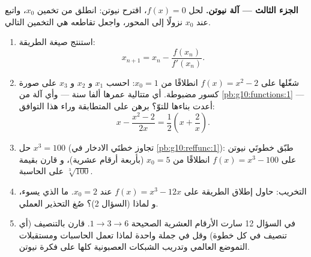\begin{problem}
\medskip
\noindent\textbf{الجزء الثالث --- آلة نيوتن.}
لحل $f(x) = 0$، اقترح نيوتن: انطلق من تخمين
$x_0$، واتبع  عند $x_0$ نزولًا إلى المحور، واجعل
 تقاطعه هي التخمين التالي.
\begin{enumerate}[resume]
  \item استنتج صيغة الطريقة:
        \[
        x_{n + 1} = x_n - \frac{f(x_n)}{f'(x_n)} .
        \]
  \item شغّلها على $f(x) = x^2 - 2$ انطلاقًا من $x_0 = 1$: احسب
        $x_1$ و $x_2$ و $x_3$ على صورة كسور مضبوطة. أي
        متتالية عمرها ألفا سنة --- وأي آلة
        من \cref{pb:g10:functions:1} --- أعدت بناءها للتوّ؟
        برهن على المتطابقة وراء هذا التوافق:
        \[
        x - \frac{x^2 - 2}{2x} = \frac12\left(x +
        \frac2x\right).
        \]
  \item حل $x^3 = 100$ (تجاوز خطتَي الادخار في
        \cref{pb:g10:reffunc:1}): طبّق خطوتَي نيوتن على
        $f(x) = x^3 - 100$ انطلاقًا من $x_0 = 5$ (بأربعة أرقام عشرية)، و
        قارن بقيمة $\sqrt[3]{100}$ على الحاسبة.
  \item التخريب: حاول إطلاق الطريقة على
        $f(x) = x^3 - 12x$ عند $x_0 = 2$. ما الذي يسوء، و
        لماذا (السؤال 2)؟ صُغ التحذير العملي.
  \item في السؤال 12 سارت الأرقام العشرية الصحيحة 
        $1 \to 3 \to 6$. قارن بالتنصيف (أي تنصيف
         في كل خطوة) وقل في جملة واحدة لماذا
        تعمل الحاسبات ومستقبلات التموضع العالمي وتدريب الشبكات
        العصبونية كلها على فكرة نيوتن.
\end{enumerate}


\end{problem}
